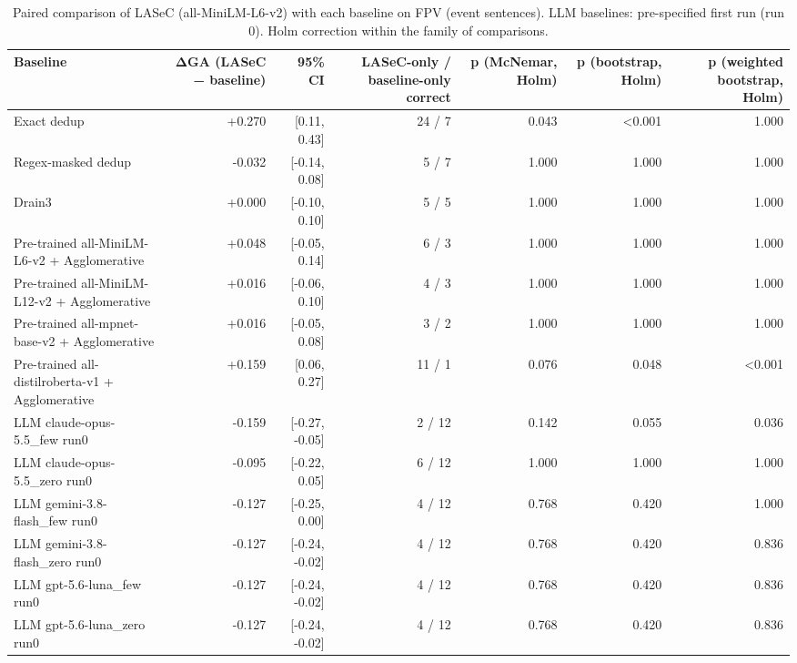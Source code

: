 \begin{table}[t]
\centering
\caption{Paired comparison of LASeC (all-MiniLM-L6-v2) with each baseline on FPV (event sentences). LLM baselines: pre-specified first run (run 0). Holm correction within the family of comparisons.}
\label{tab:significance_events}
\small
\begin{tabular}{lrrrrrr}
\toprule
Baseline & ΔGA (LASeC − baseline) & 95\% CI & LASeC-only / baseline-only correct & p (McNemar, Holm) & p (bootstrap, Holm) & p (weighted bootstrap, Holm) \\
\midrule
Exact dedup & +0.270 & [0.11, 0.43] & 24 / 7 & 0.043 & <0.001 & 1.000 \\
Regex-masked dedup & -0.032 & [-0.14, 0.08] & 5 / 7 & 1.000 & 1.000 & 1.000 \\
Drain3 & +0.000 & [-0.10, 0.10] & 5 / 5 & 1.000 & 1.000 & 1.000 \\
Pre-trained all-MiniLM-L6-v2 + Agglomerative & +0.048 & [-0.05, 0.14] & 6 / 3 & 1.000 & 1.000 & 1.000 \\
Pre-trained all-MiniLM-L12-v2 + Agglomerative & +0.016 & [-0.06, 0.10] & 4 / 3 & 1.000 & 1.000 & 1.000 \\
Pre-trained all-mpnet-base-v2 + Agglomerative & +0.016 & [-0.05, 0.08] & 3 / 2 & 1.000 & 1.000 & 1.000 \\
Pre-trained all-distilroberta-v1 + Agglomerative & +0.159 & [0.06, 0.27] & 11 / 1 & 0.076 & 0.048 & <0.001 \\
LLM claude-opus-5.5\_few run0 & -0.159 & [-0.27, -0.05] & 2 / 12 & 0.142 & 0.055 & 0.036 \\
LLM claude-opus-5.5\_zero run0 & -0.095 & [-0.22, 0.05] & 6 / 12 & 1.000 & 1.000 & 1.000 \\
LLM gemini-3.8-flash\_few run0 & -0.127 & [-0.25, 0.00] & 4 / 12 & 0.768 & 0.420 & 1.000 \\
LLM gemini-3.8-flash\_zero run0 & -0.127 & [-0.24, -0.02] & 4 / 12 & 0.768 & 0.420 & 0.836 \\
LLM gpt-5.6-luna\_few run0 & -0.127 & [-0.24, -0.02] & 4 / 12 & 0.768 & 0.420 & 0.836 \\
LLM gpt-5.6-luna\_zero run0 & -0.127 & [-0.24, -0.02] & 4 / 12 & 0.768 & 0.420 & 0.836 \\
\bottomrule
\end{tabular}
\end{table}